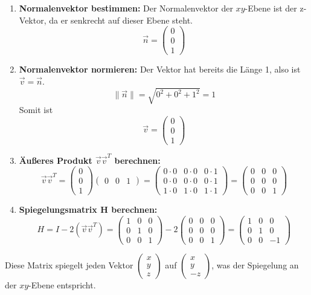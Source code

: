 \begin{enumerate}
   \item \textbf{Normalenvektor bestimmen:} Der Normalenvektor der $xy$-Ebene ist der z-Vektor, da er senkrecht auf dieser Ebene steht.
         \[ \vec{n} = \begin{pmatrix} 0 \\ 0 \\ 1 \end{pmatrix} \]

   \item \textbf{Normalenvektor normieren:} Der Vektor hat bereits die Länge 1, also ist $\vec{v} = \vec{n}$.
         \[ \|\vec{n}\| = \sqrt{0^2 + 0^2 + 1^2} = 1 \]
         Somit ist \[ \vec{v} = \begin{pmatrix} 0 \\ 0 \\ 1 \end{pmatrix} \]

   \item \textbf{Äußeres Produkt $\vec{v}\vec{v}^T$ berechnen:}
         \[ \vec{v}\vec{v}^T = \begin{pmatrix} 0 \\ 0 \\ 1 \end{pmatrix} \begin{pmatrix} 0 & 0 & 1 \end{pmatrix} = \begin{pmatrix}
               0 \cdot 0 & 0 \cdot 0 & 0 \cdot 1 \\
               0 \cdot 0 & 0 \cdot 0 & 0 \cdot 1 \\
               1 \cdot 0 & 1 \cdot 0 & 1 \cdot 1
            \end{pmatrix} = \begin{pmatrix}
               0 & 0 & 0 \\
               0 & 0 & 0 \\
               0 & 0 & 1
            \end{pmatrix} \]

   \item \textbf{Spiegelungsmatrix H berechnen:}
         \[ H = I - 2(\vec{v}\vec{v}^T) = \begin{pmatrix}
               1 & 0 & 0 \\
               0 & 1 & 0 \\
               0 & 0 & 1
            \end{pmatrix} - 2 \begin{pmatrix}
               0 & 0 & 0 \\
               0 & 0 & 0 \\
               0 & 0 & 1
            \end{pmatrix} = \begin{pmatrix}
               1 & 0 & 0  \\
               0 & 1 & 0  \\
               0 & 0 & -1
            \end{pmatrix} \]
\end{enumerate}
Diese Matrix spiegelt jeden Vektor $\begin{pmatrix} x \\ y \\ z \end{pmatrix}$ auf $\begin{pmatrix} x \\ y \\ -z \end{pmatrix}$, was der Spiegelung an der $xy$-Ebene entspricht.